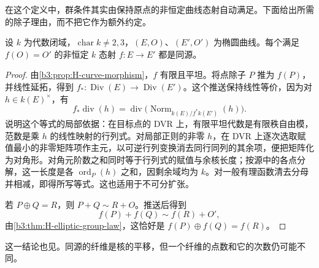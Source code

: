 在这个定义中，群条件其实由保持原点的非恒定曲线态射自动满足。下面给出所需的除子理由，而不把它作为额外约定。

\begin{lemma}\label{b3:lem:H-origin-morphism-homomorphism}
	设 \(k\) 为代数闭域，\(\operatorname{char}k\ne2,3\)，\((E,O)\)、\((E',O')\) 为椭圆曲线。每个满足 \(f(O)=O'\) 的非恒定 \(k\) 态射 \(f:E\rightarrow E'\) 都是同源。
\end{lemma}
\begin{proof}
	由\cref{b3:prop:H-curve-morphism}，\(f\) 有限且平坦。将点除子 \(P\) 推为 \(f(P)\)，并线性延拓，得到 \(f_*:\operatorname{Div}(E)\rightarrow\operatorname{Div}(E')\)。这个推送保持线性等价，因为对 \(h\in k(E)^\times\)，有
	\[
		f_*\operatorname{div}(h)
		=\operatorname{div}\bigl(\operatorname{Norm}_{k(E)/f^*k(E')}(h)\bigr).
	\]
	说明这个等式的局部依据：在目标点的 DVR 上，有限平坦代数是有限秩自由模，范数是乘 \(h\) 的线性映射的行列式。对局部正则的非零 \(h\)，在 DVR 上逐次选取赋值最小的非零矩阵项作主元，以可逆行列变换消去同行同列的其余项，便把矩阵化为对角形。对角元阶数之和同时等于行列式的赋值与余核长度；按源中的各点分解，这一长度是各 \(\operatorname{ord}_P(h)\) 之和，因剩余域均为 \(k\)。对一般有理函数清去分母并相减，即得所写等式。这也适用于不可分扩张。

	若 \(P\oplus Q=R\)，则 \(P+Q\sim R+O\)。推送后得到
	\[
		f(P)+f(Q)\sim f(R)+O',
	\]
	由\cref{b3:thm:H-elliptic-group-law}，这恰好是 \(f(P)\oplus f(Q)=f(R)\)。
\end{proof}

这一结论也见\cite[Chapter IV, Lemma 4.9, p. 322]{Hartshorne1977}。同源的纤维是核的平移，但一个纤维的点数和它的次数仍可能不同。

